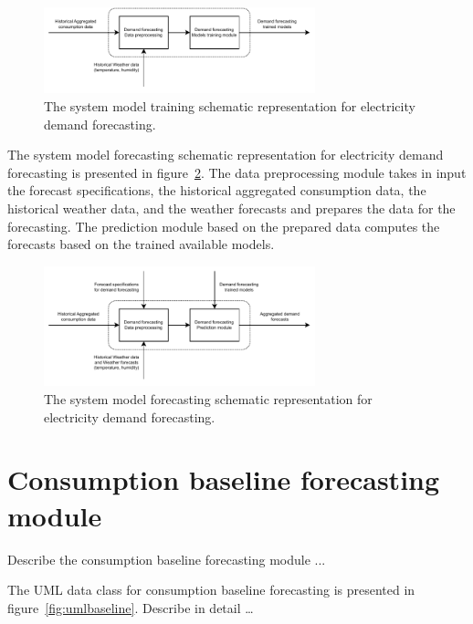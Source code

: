 \begin{figure}[H]
\centering
\includegraphics[width=0.7\textwidth]{images/system_model_training_demand}
\caption{The system model training schematic representation for electricity demand forecasting.}
\label{fig:modeltrainingdemand}
\end{figure}

The system model forecasting schematic representation for electricity demand forecasting is presented in figure~\ref{fig:modelforecastingdemand}.
The data preprocessing module takes in input the forecast specifications, the historical aggregated consumption data, the historical weather data, and the weather forecasts and prepares the data for the forecasting.
The prediction module based on the prepared data computes the forecasts based on the trained available models.

\begin{figure}[H]
\centering
\includegraphics[width=0.7\textwidth]{images/system_model_forecasting_demand}
\caption{The system model forecasting schematic representation for electricity demand forecasting.}
\label{fig:modelforecastingdemand}
\end{figure}


\section{Consumption baseline forecasting module}
\label{sec:baselinemodel}
\vspace{0.2 cm}

Describe the consumption baseline forecasting module ...

The UML data class for consumption baseline forecasting is presented in figure~\ref{fig:umlbaseline}.
Describe in detail …

